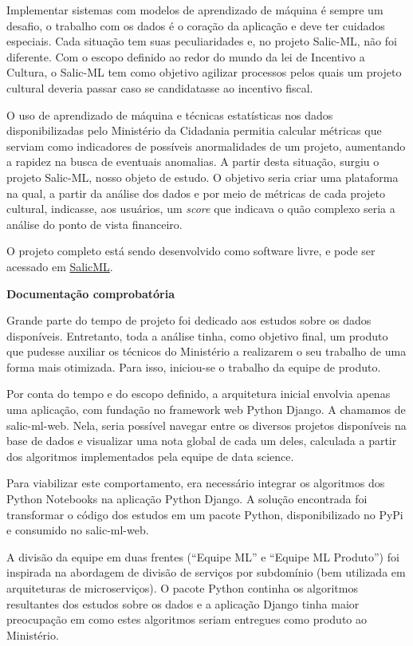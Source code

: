Implementar sistemas com modelos de aprendizado de máquina é sempre um
desafio, o trabalho com os dados é o coração da aplicação e deve ter
cuidados especiais. Cada situação tem suas peculiaridades e, no projeto
Salic-ML, não foi diferente. Com o escopo definido ao redor do mundo da
lei de Incentivo a Cultura, o Salic-ML tem como objetivo agilizar
processos pelos quais um projeto cultural deveria passar caso se
candidatasse ao incentivo fiscal.

O uso de aprendizado de máquina e técnicas estatísticas nos dados
disponibilizadas pelo Ministério da Cidadania permitia calcular métricas
que serviam como indicadores de possíveis anormalidades de um projeto,
aumentando a rapidez na busca de eventuais anomalias. A partir desta
situação, surgiu o projeto Salic-ML, nosso objeto de estudo. O objetivo
seria criar uma plataforma na qual, a partir da análise dos dados e por
meio de métricas de cada projeto cultural, indicasse, aos usuários, um
\emph{score} que indicava o quão complexo seria a análise do ponto de
vista financeiro.

O projeto completo está sendo desenvolvido como software livre, e pode
ser acessado em \href{https://github.com/lappis-unb/salic-ml}{SalicML}.

\textbf{Documentação comprobatória}

Grande parte do tempo de projeto foi dedicado aos estudos sobre os dados
disponíveis. Entretanto, toda a análise tinha, como objetivo final, um
produto que pudesse auxiliar os técnicos do Ministério a realizarem o
seu trabalho de uma forma mais otimizada. Para isso, iniciou-se o
trabalho da equipe de produto.

Por conta do tempo e do escopo definido, a arquitetura inicial envolvia
apenas uma aplicação, com fundação no framework web Python Django. A
chamamos de salic-ml-web. Nela, seria possível navegar entre os diversos
projetos disponíveis na base de dados e visualizar uma nota global de
cada um deles, calculada a partir dos algoritmos implementados pela
equipe de data science.

Para viabilizar este comportamento, era necessário integrar os
algoritmos dos Python Notebooks na aplicação Python Django. A solução
encontrada foi transformar o código dos estudos em um pacote Python,
disponibilizado no PyPi e consumido no salic-ml-web.

A divisão da equipe em duas frentes (``Equipe ML'' e ``Equipe ML
Produto'') foi inspirada na abordagem de divisão de serviços por
subdomínio (bem utilizada em arquiteturas de microserviços). O pacote
Python continha os algoritmos resultantes dos estudos sobre os dados e a
aplicação Django tinha maior preocupação em como estes algoritmos seriam
entregues como produto ao Ministério.

